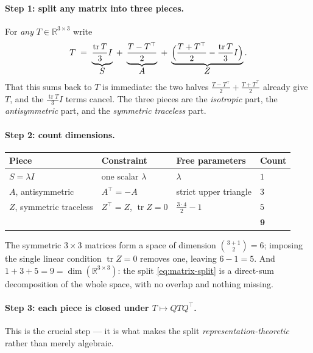 \documentclass[11pt,a4paper]{report}
\theoremstyle{definition}
\theoremstyle{remark}
\DeclareMathOperator{\tr}{tr}
\newcommand{\RR}{\mathbb R}
\begin{document}
\paragraph{Step 1: split any matrix into three pieces.} For \emph{any}
$T\in\RR^{3\times3}$ write
\begin{equation}
\label{eq:matrix-split}
T
\;=\;
\underbrace{\frac{\tr T}{3}I}_{\textstyle S}
\;+\;
\underbrace{\frac{T-T^\top}{2}}_{\textstyle A}
\;+\;
\underbrace{\Bigl(\frac{T+T^\top}{2}-\frac{\tr T}{3}I\Bigr)}_{\textstyle Z} .
\end{equation}
That this sums back to $T$ is immediate: the two halves
$\frac{T-T^\top}2+\frac{T+T^\top}2$ already give $T$, and the
$\frac{\tr T}3I$ terms cancel. The three pieces are the \emph{isotropic}
part, the \emph{antisymmetric} part, and the \emph{symmetric traceless}
part.

\paragraph{Step 2: count dimensions.}
\begin{center}
\begin{tabular}{llll}
\toprule
Piece & Constraint & Free parameters & Count \\
\midrule
$S=\lambda I$ & one scalar $\lambda$ & $\lambda$ & $1$ \\
$A$, antisymmetric & $A^\top=-A$ & strict upper triangle & $3$ \\
$Z$, symmetric traceless & $Z^\top=Z$, $\tr Z=0$ & $\tfrac{3\cdot4}{2}-1$ & $5$ \\
\midrule
& & & $\mathbf{9}$ \\
\bottomrule
\end{tabular}
\end{center}
The symmetric $3\times3$ matrices form a space of dimension
$\binom{3+1}{2}=6$; imposing the single linear condition $\tr Z=0$ removes
one, leaving $6-1=5$. And $1+3+5=9=\dim(\RR^{3\times3})$: the split
\eqref{eq:matrix-split} is a direct-sum decomposition of the whole space,
with no overlap and nothing missing.

\paragraph{Step 3: each piece is closed under $T\mapsto QTQ^\top$.} This is
the crucial step --- it is what makes the split \emph{representation-theoretic}
rather than merely algebraic.
\end{document}
